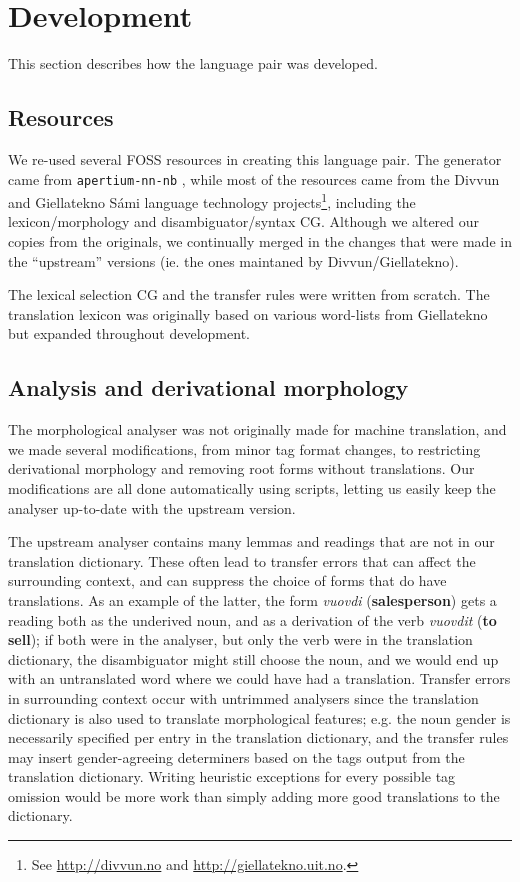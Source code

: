 \documentclass{book}
\begin{document}
\section{Development}
  \label{sec:development}

This section describes how the language pair was developed.
\subsection{Resources}
We re-used several FOSS resources in creating this language pair. The
\nob{} generator came from {\tt apertium-nn-nb}
\citep{unhammer2009rfr}, while most of the \sme{} resources came from
the Divvun and Giellatekno S\'{a}mi language technology
projects\footnote{See \href{http://divvun.no}{http://divvun.no} and
  \href{http://giellatekno.uit.no}{http://giellatekno.uit.no}.},
including the lexicon/morphology and disambiguator/syntax CG. Although
we altered our copies from the originals, we continually merged in the
changes that were made in the ``upstream'' versions (ie. the ones
maintaned by Divvun/Giellatekno).

The lexical selection CG and the transfer rules were written from
scratch. The translation lexicon was originally based on various
word-lists from Giellatekno but expanded throughout development.

\subsection{Analysis and derivational morphology}
The morphological analyser was not originally made for machine
translation, and we made several modifications, from minor tag format
changes, to restricting derivational morphology and removing root
forms without translations. Our modifications are all done
automatically using scripts, letting us easily keep the analyser
up-to-date with the upstream version.

The upstream analyser contains many lemmas and readings that are not
in our translation dictionary. These often lead to transfer errors
that can affect the surrounding context, and can suppress the choice
of forms that do have translations. As an example of the latter, the
form \textit{vuovdi} (\textbf{salesperson}) gets a reading both as the
underived noun, and as a derivation of the verb \textit{vuovdit}
(\textbf{to sell}); if both were in the analyser, but only the verb
were in the translation dictionary, the disambiguator might still
choose the noun, and we would end up with an untranslated word where
we could have had a translation. Transfer errors in surrounding
context occur with untrimmed analysers since the translation
dictionary is also used to translate morphological features; e.g. the
\nob{} noun gender is necessarily specified per entry in the
translation dictionary, and the transfer rules may insert
gender-agreeing determiners based on the tags output from the
translation dictionary. Writing heuristic exceptions for every
possible tag omission would be more work than simply adding more good
translations to the dictionary.
\end{document}
